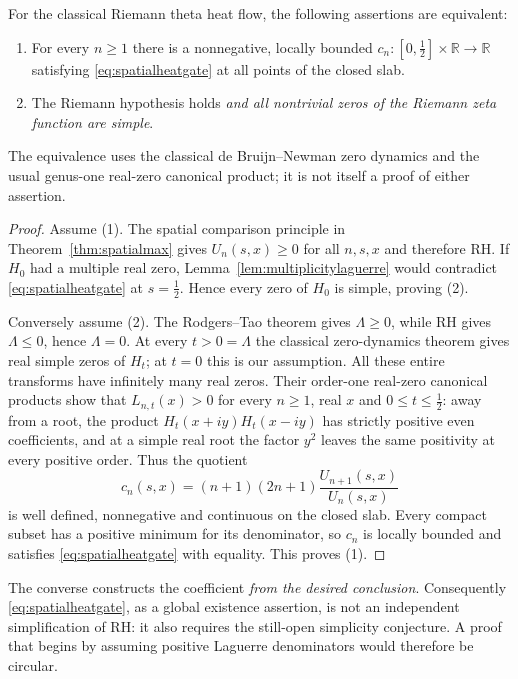 \begin{theorem}\label{thm:spatialequivalence}
For the classical Riemann theta heat flow,
the following assertions are equivalent:
\begin{enumerate}
\item For every $n\ge1$ there is a
nonnegative, locally bounded
$c_n:[0,\tfrac12]\times\mathbb R\to\mathbb R$
satisfying \eqref{eq:spatialheatgate}
at all points of the closed slab.
\item The Riemann hypothesis holds
\emph{and all nontrivial zeros of the
Riemann zeta function are simple}.
\end{enumerate}
The equivalence uses the classical
de Bruijn--Newman zero dynamics and
the usual genus-one real-zero
canonical product; it is not itself
a proof of either assertion.
\end{theorem}
\begin{proof}
Assume (1). The spatial comparison
principle in
Theorem~\ref{thm:spatialmax}
gives $U_n(s,x)\ge0$ for all
$n,s,x$ and therefore RH.
If $H_0$ had a multiple real zero,
Lemma~\ref{lem:multiplicitylaguerre}
would contradict
\eqref{eq:spatialheatgate} at
$s=\tfrac12$. Hence every zero
of $H_0$ is simple, proving (2).

Conversely assume (2). The
Rodgers--Tao theorem gives
$\Lambda\ge0$, while RH gives
$\Lambda\le0$, hence $\Lambda=0$.
At every $t>0=\Lambda$
the classical zero-dynamics theorem
gives real simple zeros of $H_t$;
at $t=0$ this is our assumption.
All these entire transforms
have infinitely many real zeros.
Their order-one real-zero canonical
products show that
$L_{n,t}(x)>0$ for every
$n\ge1$, real $x$ and
$0\le t\le\tfrac12$:
away from a root, the product
$H_t(x+iy)H_t(x-iy)$ has
strictly positive even
coefficients, and at a simple
real root the factor $y^2$
leaves the same positivity at
every positive order.
Thus the quotient
\begin{equation}
c_n(s,x)=
(n+1)(2n+1)\frac{U_{n+1}(s,x)}{U_n(s,x)}
\label{eq:exactlocquotient}
\end{equation}
is well defined, nonnegative
and continuous on the closed slab.
Every compact subset has a
positive minimum for its
denominator, so $c_n$ is
locally bounded and satisfies
\eqref{eq:spatialheatgate} with
equality. This proves (1).
\end{proof}

The converse constructs the coefficient
\emph{from the desired conclusion}.
Consequently \eqref{eq:spatialheatgate},
as a global existence assertion,
is not an independent simplification
of RH: it also requires the still-open
simplicity conjecture. A proof that
begins by assuming positive Laguerre
denominators would therefore be circular.

